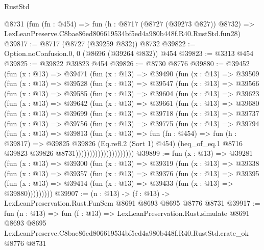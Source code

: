\begin{lexlean}{RustStd}
\begin{coremodule}
    @8731
    (fun (fn : @454) =>
    fun (h : @8717 (@8727 (@39273 @827)) @8732) =>
    LexLeanPreserve.C8bae86ed806619534bf5ed4a980b448f.R40.RustStd.fun28)
@39817 := @8717 (@8727 (@39259 @832)) @8732
@39822 := Option.noConfusion.{0, 0} (@8696 (@39264 @832)) @454
@39823 := @3313 @454
@39825 := @39822 @39823 @454
@39826 := @8730 @8776
@39880 := @39452
    (fun (x : @13) =>
    @39471
      (fun (x : @13) =>
      @39490
        (fun (x : @13) =>
        @39509
          (fun (x : @13) =>
          @39528
            (fun (x : @13) =>
            @39547
              (fun (x : @13) =>
              @39566
                (fun (x : @13) =>
                @39585
                  (fun (x : @13) =>
                  @39604
                    (fun (x : @13) =>
                    @39623
                      (fun (x : @13) =>
                      @39642
                        (fun (x : @13) =>
                        @39661
                          (fun (x : @13) =>
                          @39680
                            (fun (x : @13) =>
                            @39699
                              (fun (x : @13) =>
                              @39718
                                (fun (x : @13) =>
                                @39737
                                  (fun (x : @13) =>
                                  @39756
                                    (fun (x : @13) =>
                                    @39775
                                      (fun (x : @13) =>
                                      @39794
                                        (fun (x : @13) =>
                                        @39813
                                          (fun (x : @13) =>
                                          fun (fn : @454) =>
                                          fun (h : @39817) =>
                                          @39825
                                            @39826
                                            (Eq.refl.{2} (Sort 1) @454)
                                            (heq_of_eq.{1}
                                              @8716
                                              @39823
                                              @39826
                                              @8731)))))))))))))))))))))
@39899 := fun (x : @13) =>
  @39281
    (fun (x : @13) =>
    @39300
      (fun (x : @13) =>
      @39319
        (fun (x : @13) =>
        @39338
          (fun (x : @13) =>
          @39357
            (fun (x : @13) =>
            @39376
              (fun (x : @13) =>
              @39395
                (fun (x : @13) => @39414 (fun (x : @13) => @39433 (fun (x : @13) => @39880)))))))))
@39907 := (n : @13) -> (f : @13) -> LexLeanPreservation.Rust.FunSem @8691 @8693 @8695 @8776 @8731
@39917 := fun (n : @13) =>
  fun (f : @13) =>
  LexLeanPreservation.Rust.simulate
    @8691
    @8693
    @8695
    LexLeanPreserve.C8bae86ed806619534bf5ed4a980b448f.R40.RustStd.crate_ok
    @8776
    @8731
\end{coremodule}
\end{lexlean}
